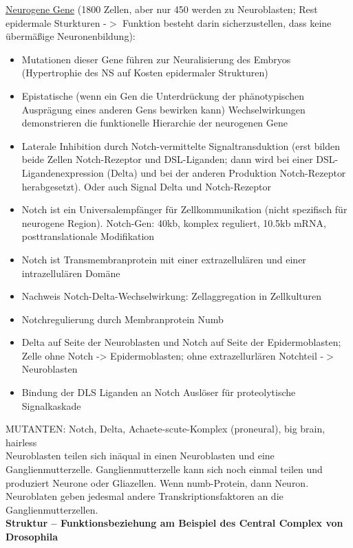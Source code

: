 \documentclass[12pt,a4paper]{article}
\begin{document}
\underline{Neurogene Gene} (1800 Zellen, aber nur 450 werden zu Neuroblasten; Rest epidermale Sturkturen -$>$ Funktion besteht darin sicherzustellen, dass keine übermäßige Neuronenbildung):
\begin{itemize}
	\item Mutationen dieser Gene führen zur Neuralisierung des Embryos (Hypertrophie des NS auf Kosten epidermaler Strukturen)
	\item Epistatische (wenn ein Gen die Unterdrückung der phänotypischen Ausprägung eines anderen Gens bewirken kann) Wechselwirkungen demonstrieren die funktionelle Hierarchie der neurogenen Gene
	\item Laterale Inhibition durch Notch-vermittelte Signaltransduktion (erst bilden beide Zellen Notch-Rezeptor und DSL-Liganden; dann wird bei einer DSL-Ligandenexpression (Delta) und bei der anderen Produktion Notch-Rezeptor herabgesetzt). Oder auch Signal Delta und Notch-Rezeptor
	\item Notch ist ein Universalempfänger für Zellkommunikation (nicht spezifisch für neurogene Region). Notch-Gen: 40kb, komplex reguliert, 10.5kb mRNA, posttranslationale Modifikation
	\item Notch ist Transmembranprotein mit einer extrazellulären und einer intrazellulären Domäne
	\item Nachweis Notch-Delta-Wechselwirkung: Zellaggregation in Zellkulturen
	\item Notchregulierung durch Membranprotein Numb
	\item Delta auf Seite der Neuroblasten und Notch auf Seite der Epidermoblasten; Zelle ohne Notch -> Epidermoblasten; ohne extrazellurlären Notchteil -$>$ Neuroblasten
	\item Bindung der DLS Liganden an Notch Auslöser für proteolytische Signalkaskade
\end{itemize}

MUTANTEN: Notch, Delta, Achaete-scute-Komplex (proneural), big brain, hairless\\

Neuroblasten teilen sich inäqual in einen Neuroblasten und eine Ganglienmutterzelle. Ganglienmutterzelle kann sich noch einmal teilen und produziert Neurone oder Gliazellen. Wenn numb-Protein, dann Neuron. Neuroblaten geben jedesmal andere Transkriptionsfaktoren an die Ganglienmutterzellen.\\

\textbf{Struktur – Funktionsbeziehung am Beispiel des Central Complex von Drosophila
}\\
\end{document}
